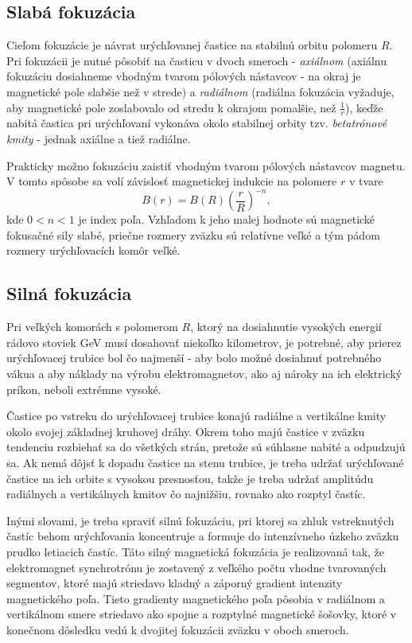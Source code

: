 \documentclass[../../main.tex]{subfiles}
\begin{document}
\subsection{Slabá fokuzácia}

Cieľom fokuzácie je návrat urýchľovanej častice na stabilnú orbitu polomeru $R$. Pri fokuzácii je nutné pôsobiť na časticu v dvoch smeroch - \textit{axiálnom} (axiálnu fokuzáciu dosiahneme vhodným tvarom pólových nástavcov - na okraj je magnetické pole slabšie než v strede) a \textit{radiálnom} (radiálna fokuzácia vyžaduje, aby magnetické pole zoslabovalo od stredu k okrajom pomalšie, než $\frac{1}{r}$), keďže nabitá častica pri urýchľovaní vykonáva okolo stabilnej orbity tzv. \textit{betatrónové kmity} - jednak axiálne a tiež radiálne.

Prakticky možno fokuzáciu zaistiť vhodným tvarom pólových nástavcov magnetu. V tomto spôsobe sa volí závislosť magnetickej indukcie na polomere $r$ v tvare
\begin{equation}
B(r)=B(R)\left(\dfrac{r}{R}\right)^{-n},
\end{equation}
kde $0<n<1$ je index poľa. Vzhľadom k jeho malej hodnote sú magnetické fokusačné sily slabé, priečne rozmery zväzku sú relatívne veľké a tým pádom rozmery urýchľovacích komôr veľké.

\subsection{Silná fokuzácia}

Pri veľkých komorách s polomerom $R$, ktorý na dosiahnutie vysokých energií rádovo stoviek GeV musí dosahovať niekoľko kilometrov, je potrebné, aby prierez urýchľovacej trubice bol čo najmenší - aby bolo možné dosiahnuť potrebného vákua a aby náklady na výrobu elektromagnetov, ako aj nároky na ich elektrický príkon, neboli extrémne vysoké.

Častice po vstreku do urýchľovacej trubice konajú radiálne a vertikálne kmity okolo svojej základnej kruhovej dráhy. Okrem toho majú častice v zväzku tendenciu rozbiehať sa do všetkých strán, pretože sú súhlasne nabité a odpudzujú sa. Ak nemá dôjsť k dopadu častice na stenu trubice, je treba udržať urýchľované častice na ich orbite s vysokou presnosťou, takže je treba udržať amplitúdu radiálnych a vertikálnych kmitov čo najnižšiu, rovnako ako rozptyl častíc.

Inými slovami, je treba spraviť silnú fokuzáciu, pri ktorej sa zhluk vstreknutých častíc behom urýchľovania koncentruje a formuje do intenzívneho úzkeho zväzku prudko letiacich častíc. Táto silný magnetická fokuzácia je realizovaná tak, že elektromagnet synchrotrónu je zostavený z veľkého počtu vhodne tvarovaných segmentov, ktoré majú striedavo kladný a záporný gradient intenzity magnetického poľa. Tieto gradienty magnetického poľa pôsobia v radiálnom a vertikálnom smere striedavo ako spojne a rozptylné magnetické šošovky, ktoré v konečnom dôsledku vedú k dvojitej fokuzácii zväzku v oboch smeroch.
\end{document}
